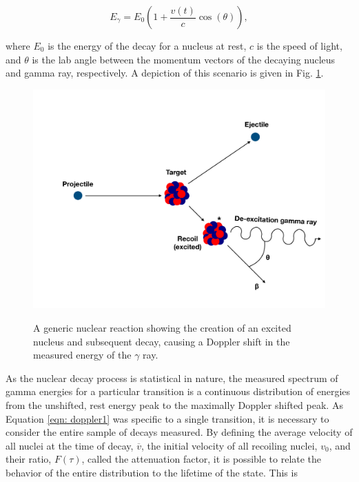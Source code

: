 \begin{equation}
E_{\gamma} = E_{0} \left(1 + \dfrac{v(t)}{c} \cos (\theta)   \right),
\label{eqn: doppler1}
\end{equation}

\noindent where $E_{0}$ is the energy of the decay for a nucleus at rest, $c$ is the speed of light, and $\theta$ is the lab angle between the momentum vectors of the decaying nucleus and gamma ray, respectively. A depiction of this scenario is given in Fig. \ref{fig: decay}.

\begin{figure}
\includegraphics[width=\linewidth]{figures/decay.pdf}
\label{fig: decay}
\caption{A generic nuclear reaction showing the creation of an excited nucleus and subsequent decay, causing a Doppler shift in the measured energy of the $\gamma$ ray.}
\end{figure}


As the nuclear decay process is statistical in nature, the measured spectrum of gamma energies for a particular transition is a continuous distribution of energies from the unshifted, rest energy peak to the maximally Doppler shifted peak. As Equation \ref{eqn: doppler1} was specific to a single transition, it is necessary to consider the entire sample of decays measured. By defining the average velocity of all nuclei at the time of decay, $\overline{v}$, the initial velocity of all recoiling nuclei, $v_{0}$, and their ratio, $F(\tau)$, called the attenuation factor, it is possible to relate the behavior of the entire distribution to the lifetime of the state. This is 


